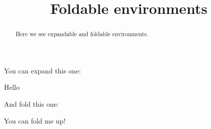 \documentclass{ximera}
\title[Examples:]{Foldable environments}
\begin{document}
\begin{abstract}
  Here we see expandable and foldable environments.
\end{abstract}
\maketitle

You can expand this one:

\begin{expandable}
  Hello
 \begin{center}
 \end{center}
\end{expandable}



And fold this one:

\begin{foldable}
  You can fold me up!
\end{foldable}
\end{document}
